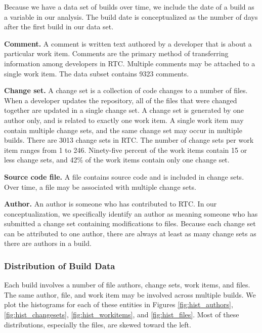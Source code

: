 Because we have a data set of builds over time, we include the date of a build as a variable in our analysis. The build date is conceptualized as the number of days after the first build in our data set.

\textbf{Comment.} A comment is written text authored by a developer that is about a particular work item. Comments are the primary method of transferring information among developers in RTC. Multiple comments may be attached to a single work item. The data subset contains 9323 comments.

\textbf{Change set.} A change set is a collection of code changes to a number of files. When a developer updates the repository, all of the files that were changed together are updated in a single change set. A change set is generated by one author only, and is related to exactly one work item. A single work item may contain multiple change sets, and the same change set may occur in multiple builds. There are 3013 change sets in RTC. The number of change sets per work item ranges from 1 to 246. Ninety-five percent of the work items contain 15 or less change sets, and 42\% of the work items contain only one change set.

\textbf{Source code file.} A file contains source code and is included in change sets. Over time, a file may be associated with multiple change sets.

\textbf{Author.} An author is someone who has contributed to RTC. In our conceptualization, we specifically identify an author as meaning someone who has submitted a change set containing modifications to files. Because each change set can be attributed to one author, there are always at least as many change sets as there are authors in a build.


\subsubsection{Distribution of Build Data}


Each build involves a number of file authors, change sets, work items, and files. The same author, file, and work item may be involved across multiple builds.
We plot the histograms for each of these entities in Figures \ref{fig:hist_authors}, \ref{fig:hist_changesets}, \ref{fig:hist_workitems}, and \ref{fig:hist_files}.
Most of these distributions, especially the files, are skewed toward the left. 

